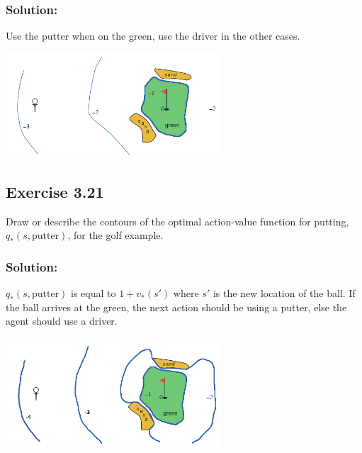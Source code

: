 \subsubsection*{Solution:}
Use the putter when on the green, use the driver in the other cases.
\begin{center}
    \includegraphics[width=0.6\textwidth]{chapters_latex/figures/ex_03_20.png}
\end{center}

\subsection*{Exercise 3.21} 
Draw or describe the contours of the optimal action-value function for putting, $q_*(s, \text{putter})$, for the golf example. 

\subsubsection*{Solution:}
$q_*(s, \text{putter})$ is equal to $1 + v_*(s')$ where $s'$ is the new location of the ball. If the ball arrives at the green, the next action should be using a putter, else the agent should use a driver.
\begin{center}
    \includegraphics[width=0.6\textwidth]{chapters_latex/figures/ex_03_21.png}
\end{center}

